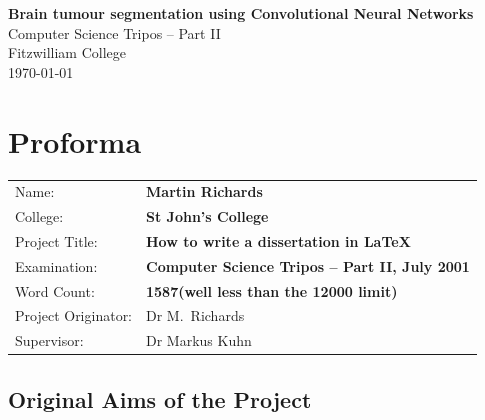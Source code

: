 \documentclass[12pt,a4paper,twoside,openright]{report}
\begin{document}





\pagestyle{empty}


\vspace*{60mm}
\begin{center}
\Huge
\textbf{Brain tumour segmentation using Convolutional Neural Networks} \\[5mm]
Computer Science Tripos -- Part II \\[5mm]
Fitzwilliam College \\[5mm]
\today  %
\end{center}


\pagestyle{plain}

\chapter*{Proforma}

{\large
\begin{tabular}{ll}
Name:               & \bf Martin Richards                       \\
College:            & \bf St John's College                     \\
Project Title:      & \bf How to write a dissertation in \LaTeX \\
Examination:        & \bf Computer Science Tripos -- Part II, July 2001  \\
Word Count:         & \bf 1587\footnotemark[1]
                      (well less than the 12000 limit)  \\
Project Originator: & Dr M.~Richards                    \\
Supervisor:         & Dr Markus Kuhn                    \\ 
\end{tabular}
}


\section*{Original Aims of the Project}
\end{document}
